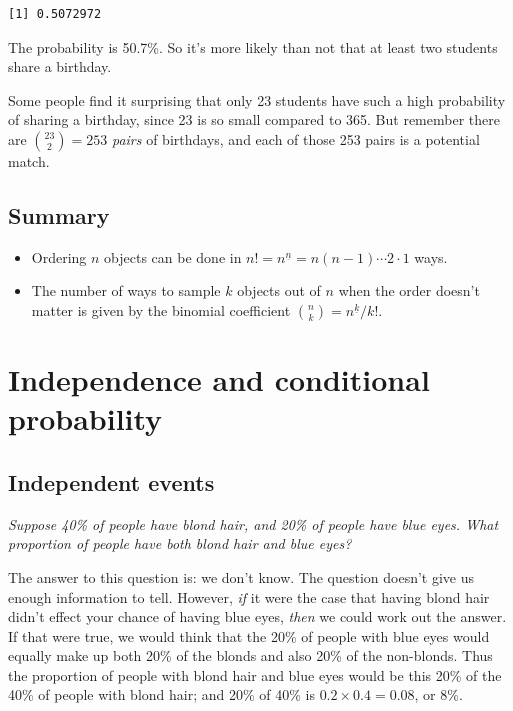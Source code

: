 \documentclass[
  letterpaper,
  DIV=11,
  numbers=noendperiod]{scrreprt}
\providecommand{\tightlist}{%
  \setlength{\itemsep}{0pt}\setlength{\parskip}{0pt}}\usepackage{longtable,booktabs,array}
\theoremstyle{remark}
\begin{document}
\begin{verbatim}
[1] 0.5072972
\end{verbatim}

The probability is 50.7\%. So it's more likely than not that at least
two students share a birthday.

Some people find it surprising that only 23 students have such a high
probability of sharing a birthday, since 23 is so small compared to 365.
But remember there are \(\binom{23}{2} = 253\) \emph{pairs} of
birthdays, and each of those 253 pairs is a potential match.

\hypertarget{summary-L06}{%
\section*{Summary}\label{summary-L06}}


\begin{itemize}
\tightlist
\item
  Ordering \(n\) objects can be done in
  \(n! = n^{\underline{n}} = n(n-1)\cdots2\cdot1\) ways.
\item
  The number of ways to sample \(k\) objects out of \(n\) when the order
  doesn't matter is given by the binomial coefficient
  \(\binom nk = {n}^{\underline{k}}/k!\).
\end{itemize}

\hypertarget{L07-conditional}{%
\chapter{Independence and conditional
probability}\label{L07-conditional}}

\hypertarget{independent-events}{%
\section{Independent events}\label{independent-events}}

\emph{Suppose 40\% of people have blond hair, and 20\% of people have
blue eyes. What proportion of people have both blond hair and blue
eyes?}

The answer to this question is: we don't know. The question doesn't give
us enough information to tell. However, \emph{if} it were the case that
having blond hair didn't effect your chance of having blue eyes,
\emph{then} we could work out the answer. If that were true, we would
think that the 20\% of people with blue eyes would equally make up both
20\% of the blonds and also 20\% of the non-blonds. Thus the proportion
of people with blond hair and blue eyes would be this 20\% of the 40\%
of people with blond hair; and 20\% of 40\% is
\(0.2 \times 0.4 = 0.08\), or 8\%.
\end{document}
